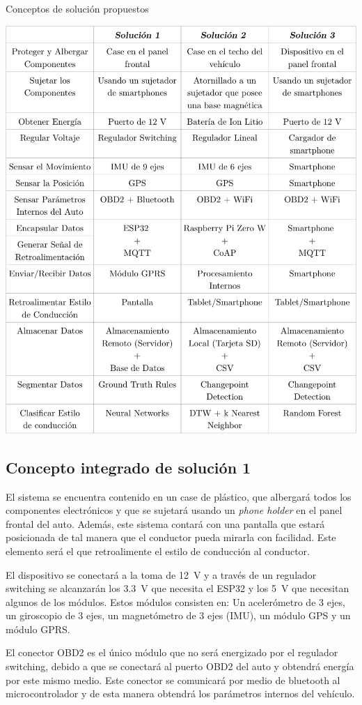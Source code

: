 \begin{table}[htbp!]
  \centering
  \caption{Conceptos de solución propuestos}
  \label{diag:sol_clas}
  \includegraphics[width=0.9\linewidth]{mat_resumen.pdf}
\end{table}
\newpage

\subsection{Concepto integrado de solución 1}
El sistema se encuentra contenido en un case de plástico, que albergará todos los componentes electrónicos y que se sujetará usando un {\it phone holder} en el panel frontal del auto. Además, este sistema contará con una pantalla que estará posicionada de tal manera que el conductor pueda mirarla con facilidad. Este elemento será el que retroalimente el estilo de conducción al conductor.

El dispositivo se conectará a la toma de \SI{12}{V} y a través de un regulador switching se alcanzarán los \SI{3.3}{V} que necesita el ESP32 y los \SI{5}{V} que necesitan algunos de los módulos.
Estos módulos consisten en: Un acelerómetro de 3 ejes, un giroscopio de 3 ejes, un magnetómetro de 3 ejes (IMU), un módulo GPS y un módulo GPRS.

El conector OBD2 es el único módulo que no será energizado por el regulador switching, debido a que se conectará al puerto OBD2 del auto y obtendrá energía por este mismo medio. Este conector se comunicará por medio de bluetooth al microcontrolador y de esta manera obtendrá los parámetros internos del vehículo.

